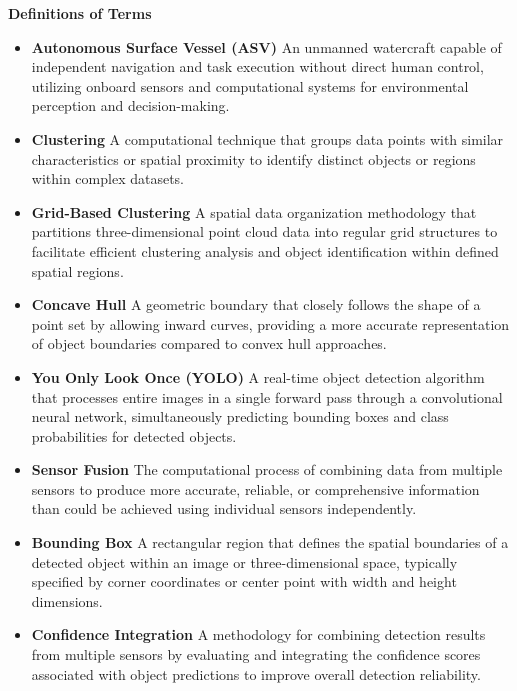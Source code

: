 \documentclass{erauthesis}
\begin{document}
\textbf{Definitions of Terms}

\begin{itemize}[label={}]
    \item\textbf{Autonomous Surface Vessel (ASV)} An unmanned watercraft capable of independent navigation and task execution without direct human control, utilizing onboard sensors and computational systems for environmental perception and decision-making.
    
    \item\textbf{Clustering} A computational technique that groups data points with similar characteristics or spatial proximity to identify distinct objects or regions within complex datasets.

    \item\textbf{Grid-Based Clustering} A spatial data organization methodology that partitions three-dimensional point cloud data into regular grid structures to facilitate efficient clustering analysis and object identification within defined spatial regions.
    
    \item\textbf{Concave Hull} A geometric boundary that closely follows the shape of a point set by allowing inward curves, providing a more accurate representation of object boundaries compared to convex hull approaches.
    
    \item\textbf{You Only Look Once (YOLO)} A real-time object detection algorithm that processes entire images in a single forward pass through a convolutional neural network, simultaneously predicting bounding boxes and class probabilities for detected objects.
    
    \item\textbf{Sensor Fusion} The computational process of combining data from multiple sensors to produce more accurate, reliable, or comprehensive information than could be achieved using individual sensors independently.
    
    \item\textbf{Bounding Box} A rectangular region that defines the spatial boundaries of a detected object within an image or three-dimensional space, typically specified by corner coordinates or center point with width and height dimensions.
    
    \item\textbf{Confidence Integration} A methodology for combining detection results from multiple sensors by evaluating and integrating the confidence scores associated with object predictions to improve overall detection reliability.
    

\end{itemize}
\end{document}
